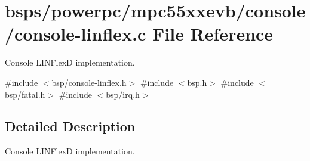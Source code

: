 \hypertarget{console-linflex_8c}{}\section{bsps/powerpc/mpc55xxevb/console/console-\/linflex.c File Reference}
\label{console-linflex_8c}


Console L\+I\+N\+FlexD implementation.  


{\ttfamily \#include $<$bsp/console-\/linflex.\+h$>$}\newline
{\ttfamily \#include $<$bsp.\+h$>$}\newline
{\ttfamily \#include $<$bsp/fatal.\+h$>$}\newline
{\ttfamily \#include $<$bsp/irq.\+h$>$}\newline


\subsection{Detailed Description}
Console L\+I\+N\+FlexD implementation. 

